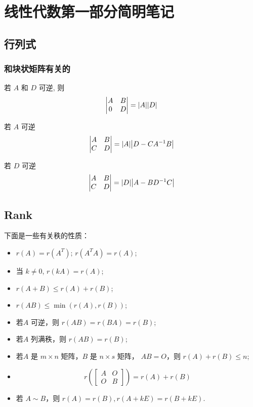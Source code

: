 \chapter{线性代数第一部分简明笔记}
\label{determinant}

\section{行列式}

\subsection{和块状矩阵有关的}

若 $A$ 和 $D$ 可逆, 则
\[
    \begin{vmatrix*}
        A & B \\
        0 & D
    \end{vmatrix*}
    =
    \abs*{A} \abs*{D}
\]

若 $A$ 可逆
\[
    \begin{vmatrix*}
        A & B \\
        C & D
    \end{vmatrix*}
    = \abs*{A} \abs*{D - CA^{-1} B}
\]

若 $D$ 可逆
\[
    \begin{vmatrix*}
        A & B \\
        C & D
    \end{vmatrix*}
    = \abs*{D} \abs*{A - BD^{-1} C}
\]

\section{Rank}
\label{rank}

\begin{corollary}
    下面是一些有关秩的性质： 

    \begin{itemize}
        \item $r(A) = r(A^T); \, r(A^TA) = r(A)$;
        \item 当 $k \neq 0$, $r(kA) = r(A)$;
        \item $r(A+B) \leq r(A) + r(B)$;
        \item $r(AB) \leq \min(r(A), r(B))$;
        \item 若$A$ 可逆，则 $r(AB) = r(BA) = r(B)$;
        \item 若$A$ 列满秩，则 $r(AB) = r(B)$;
        \item 若$A$ 是 $m \times n$ 矩阵，$B$ 是 $n \times s$ 矩阵，
            $AB = O$，则 $r(A) + r(B) \leq n$;
        \item \[
                r\left(\begin{bmatrix}
                        A & O \\
                        O & B 
                \end{bmatrix}\right) = r(A) + r(B)
            \]
        \item 若 $A \sim B$，则 $r(A) = r(B), r(A + kE) = r(B + kE)$.
    \end{itemize}
\end{corollary}

